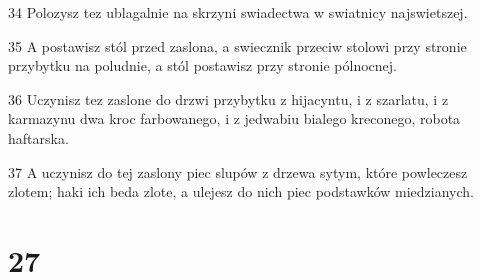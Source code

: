 \par 34 Polozysz tez ublagalnie na skrzyni swiadectwa w swiatnicy najswietszej.
\par 35 A postawisz stól przed zaslona, a swiecznik przeciw stolowi przy stronie przybytku na poludnie, a stól postawisz przy stronie pólnocnej.
\par 36 Uczynisz tez zaslone do drzwi przybytku z hijacyntu, i z szarlatu, i z karmazynu dwa kroc farbowanego, i z jedwabiu bialego kreconego, robota haftarska.
\par 37 A uczynisz do tej zaslony piec slupów z drzewa sytym, które powleczesz zlotem; haki ich beda zlote, a ulejesz do nich piec podstawków miedzianych.

\chapter{27}

